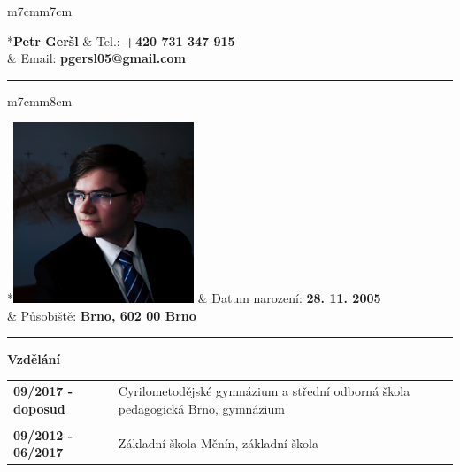 \documentclass[a4paper,10pt]{article}
\begin{document}
\pagestyle{empty}

\noindent

\begin{tabular}{m{7cm}m{7cm}}

*{\LARGE{\textbf{Petr Geršl}}} & Tel.: \textbf{+420 731 347 915} \\
& Email: \textbf{pgersl05@gmail.com}

\end{tabular}

\rule{\linewidth}{2pt}

\vspace{.4cm}

\begin{tabular}{m{7cm}m{8cm}}

*{\includegraphics[width=5.4cm]{profile.png}} & Datum narození: \textbf{28. 11. 2005} \\
& Působiště: \textbf{Brno, 602 00 Brno}

\end{tabular}

\vspace{4.4cm}

\rule{\linewidth}{1pt}

\vspace{.1cm}

{\large{\textbf{Vzdělání}}}

\vspace{.7cm}

\noindent

\begin{tabular}{m{4cm}p{11cm}}

\textbf{09/2017 - doposud} & Cyrilometodějské gymnázium a střední odborná škola pedagogická Brno, gymnázium\\
\\
\textbf{09/2012 - 06/2017} & Základní škola Měnín, základní škola

\end{tabular}
\end{document}
